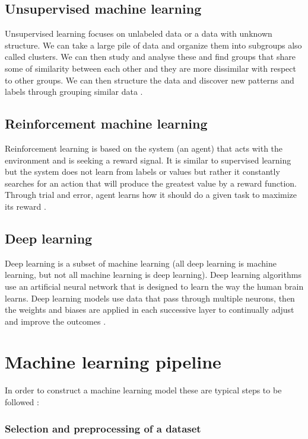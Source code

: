 \documentclass[a4paper,oneside,openright,11pt]{book}
\begin{document}
\subsection{Unsupervised machine learning}

Unsupervised learning focuses on unlabeled data or a data with unknown structure. We can take a large pile of data and organize them into subgroups also called clusters. We can then study and analyse these and find groups that share some of similarity between each other and they are more dissimilar with respect to other groups. We can then structure the data and discover new patterns and labels through grouping similar data \cite{raschka}\cite{aurelion}.

\subsection{Reinforcement machine learning}

Reinforcement learning is based on the system (an agent) that acts with the environment and is seeking a reward signal. It is similar to supervised learning but the system does not learn from labels or values but rather it constantly searches for an action that will produce the greatest value by a reward function. Through trial and error, agent learns how it should do a given task to maximize its reward \cite{raschka}\cite{aurelion}.


\subsection{Deep learning}

Deep learning is a subset of machine learning (all deep learning is machine learning, but not all machine learning is deep learning). Deep learning algorithms use an artificial neural network that is designed to learn the way the human brain learns. Deep learning models use data that pass through multiple neurons, then the weights and biases are applied in each successive layer to continually adjust and improve the outcomes \cite{Goodfellow-et-al-2016}.


\section{Machine learning pipeline}

In order to construct a machine learning model these are typical steps to be followed \cite{what_ML_IBM}:

\subsubsection{Selection and preprocessing of a dataset}
\end{document}
